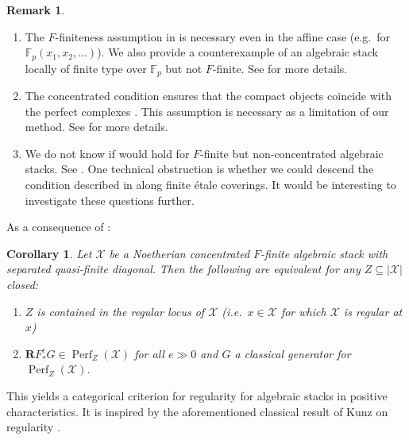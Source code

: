 \documentclass[11pt]{amsart}
\theoremstyle{plain}
\newtheorem{corollary}[theorem]{Corollary}
\theoremstyle{definition}
\newtheorem{remark}[theorem]{Remark}
\numberwithin{equation}{section}
\numberwithin{theorem}{section}
\begin{document}
\begin{remark}
    \hfill
    \begin{enumerate}
        \item The $F$-finiteness assumption in  is necessary even in the affine case (e.g.\ for $\mathbb{F}_p(x_1,x_2,\ldots)$). 
        We also provide a counterexample of an algebraic stack locally of finite type over $\mathbb{F}_p$ but not $F$-finite. See  for more details. 
        \item The concentrated condition ensures that the compact objects coincide with the perfect complexes \cite[Remark 4.6]{Hall/Rydh:2017}. 
        This assumption is necessary as a limitation of our method. 
        See  for more details. 
        \item We do not know if  would hold for $F$-finite but non-concentrated algebraic stacks. See . 
        One technical obstruction is whether we could descend the condition described in  along finite \'{e}tale coverings. 
        It would be interesting to investigate these questions further. 
    \end{enumerate}
\end{remark}

As a consequence of :

\begin{corollary}
    \label{cor:kunz}
    Let $\mathcal{X}$ be a Noetherian concentrated $F$-finite algebraic stack with separated quasi-finite diagonal. 
    Then the following are equivalent for any $Z\subseteq |\mathcal{X}|$ closed:
    \begin{enumerate}
        \item $Z$ is contained in the regular locus of $\mathcal{X}$ (i.e.\ $x\in \mathcal{X}$ for which $\mathcal{X}$ is regular at $x$)
        \item $\mathbf{R} F_\ast^e G\in \operatorname{Perf}_Z (\mathcal{X})$ for all $e \gg 0$ and $G$ a classical generator for $\operatorname{Perf}_Z (\mathcal{X})$.
    \end{enumerate}
\end{corollary}

This yields a categorical criterion for regularity for algebraic stacks in positive characteristics. 
It is inspired by the aforementioned classical result of Kunz on regularity \cite{Kunz:1976}.
\end{document}
